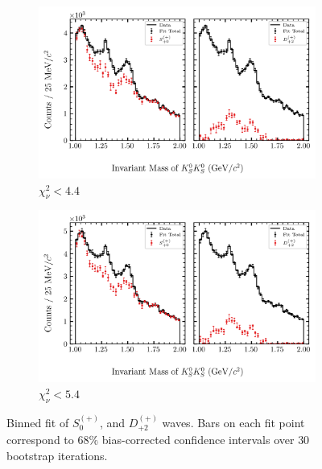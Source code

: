 \begin{figure}[htbp]
    \begin{subfigure}{0.45\textwidth}
        \includegraphics[width=\linewidth]{figures/binned_fit_chisqdof_4.4_splot_D_1s_2b_phase_factor_waves491_uncertainty_bootstrap-CI-BC.png}
        \caption{$\chi^2_\nu < 4.4$}
    \end{subfigure}
    \hfill
    \begin{subfigure}{0.45\textwidth}
        \includegraphics[width=\linewidth]{figures/binned_fit_chisqdof_5.4_splot_D_1s_2b_phase_factor_waves491_uncertainty_bootstrap-CI-BC.png}
        \caption{$\chi^2_\nu < 5.4$}
    \end{subfigure}

    \caption{Binned fit of $S_{0}^{(+)}$, and $D_{+2}^{(+)}$ waves. Bars on each fit point correspond to $68\%$ bias-corrected confidence intervals over $ 30 $ bootstrap iterations.}
    \label{fig:binned-fit-all-Sp-D2p}
\end{figure}


